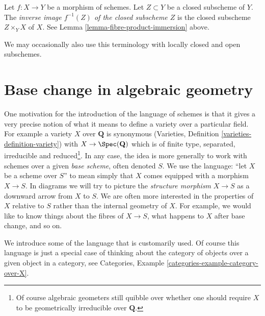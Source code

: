 \begin{definition}
\label{definition-inverse-image-closed-subscheme}
Let $f : X \to Y$ be a morphism of schemes. Let $Z \subset Y$ be a
closed subscheme of $Y$. The {\it inverse image $f^{-1}(Z)$ of the
closed subscheme $Z$} is the closed subscheme $Z \times_Y X$ of
$X$. See Lemma \ref{lemma-fibre-product-immersion} above.
\end{definition}

\noindent
We may occasionally also use this terminology with locally closed and
open subschemes.









\section{Base change in algebraic geometry}
\label{section-base-change}

\noindent
One motivation for the introduction of the language of schemes
is that it gives a very precise notion of what it means to
define a variety over a particular field. For example a variety
$X$ over $\mathbf{Q}$ is synonymous
(Varieties, Definition \ref{varieties-definition-variety})
with $X \to \Spec(\mathbf{Q})$ which is of finite type,
separated, irreducible and reduced\footnote{Of course algebraic
geometers still quibble over whether one should require $X$ to be
geometrically irreducible over $\mathbf{Q}$.}. In any case, the idea
is more generally to work with schemes over a given {\it base scheme},
often denoted $S$. We use the language: ``let $X$ be a scheme over $S$''
to mean simply that $X$ comes equipped with a morphism $X \to S$.
In diagrams we will try to picture the {\it structure morphism}
$X \to S$ as a downward arrow from $X$ to $S$.
We are often more interested in the properties of $X$ relative
to $S$ rather than the internal geometry of $X$.
For example, we would like to know things about the fibres of $X \to S$,
what happens to $X$ after base change, and so on.

\medskip\noindent
We introduce some of the language that is customarily used.
Of course this language is just a special case of thinking
about the category of objects over a given object in a category,
see Categories, Example \ref{categories-example-category-over-X}.


